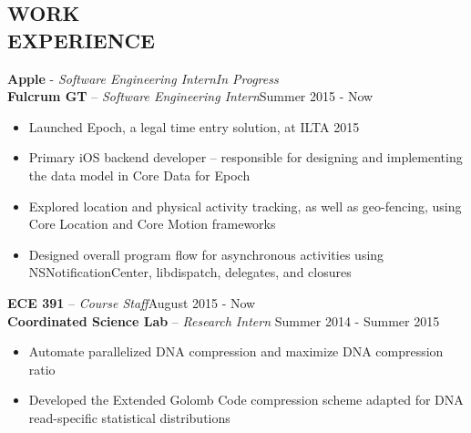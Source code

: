 \documentclass[resmargin]{res}
\begin{document}
\begin{resume}
\vspace{-4mm}
\section{WORK \\ EXPERIENCE} 
{\bf Apple} - {\sl Software Engineering Intern}\hfill \textit{In Progress}\vspace{1mm}\\
{\bf Fulcrum GT} -- {\sl Software Engineering Intern}\hfill Summer 2015 - Now
	\begin{itemize} \itemsep -2pt
	\item Launched Epoch, a legal time entry solution, at ILTA 2015
	\item Primary iOS backend developer -- responsible for designing and implementing the data model in Core Data for Epoch
	\item Explored location and physical activity tracking, as well as geo-fencing, using Core Location and Core Motion frameworks
	\item Designed overall program flow for asynchronous activities using NSNotificationCenter, libdispatch, delegates, and closures
	\end{itemize}
\vspace{-3mm}
{\bf ECE 391} -- {\sl Course Staff}\hfill August 2015 - Now\vspace{1mm}\\
{\bf Coordinated Science Lab} -- {\sl Research Intern }\hfill Summer 2014 - Summer 2015
                 \begin{itemize}  \itemsep -2pt %
                 \item Automate parallelized DNA compression and maximize DNA compression ratio
                 \item Developed the Extended Golomb Code compression scheme adapted for DNA read-specific statistical distributions
                \end{itemize}
 
\vspace{-4mm}

\end{resume}
\end{document}
